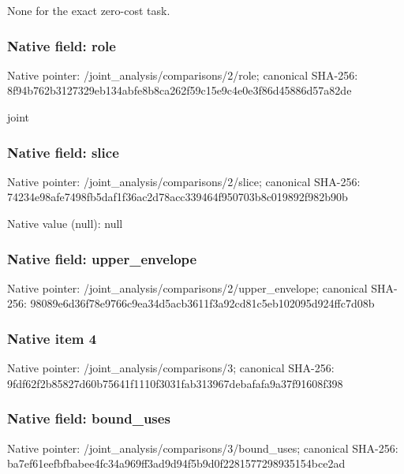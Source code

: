 \documentclass[10pt,a4paper]{article}
\begin{document}
\begingroup\raggedright\sloppy None for the exact zero-cost task.\par\endgroup

\subsubsection{Native field: role}
Native pointer: /joint\_\allowbreak{}analysis/comparisons/2/role; canonical SHA-256: 8f94b762b3127329eb134abfe8b8ca262f59c15e9c4e0e3f86d45886d57a82de

\begingroup\raggedright\sloppy joint\par\endgroup

\subsubsection{Native field: slice}
Native pointer: /joint\_\allowbreak{}analysis/comparisons/2/slice; canonical SHA-256: 74234e98afe7498fb5daf1f36ac2d78acc339464f950703b8c019892f982b90b

Native value (null): null

\subsubsection{Native field: upper\_\allowbreak{}envelope}
Native pointer: /joint\_\allowbreak{}analysis/comparisons/2/upper\_\allowbreak{}envelope; canonical SHA-256: 98089e6d36f78e9766c9ea34d5acb3611f3a92cd81c5eb102095d924ffc7d08b

\begingroup\raggedright{}\par\endgroup

\subsubsection{Native item 4}
Native pointer: /joint\_\allowbreak{}analysis/comparisons/3; canonical SHA-256: 9fdf62f2b85827d60b75641f1110f3031fab313967debafafa9a37f91608f398

\subsubsection{Native field: bound\_\allowbreak{}uses}
Native pointer: /joint\_\allowbreak{}analysis/comparisons/3/bound\_\allowbreak{}uses; canonical SHA-256: ba7ef61eefbfbabee4fc34a969ff3ad9d94f5b9d0f2281577298935154bce2ad
\end{document}
